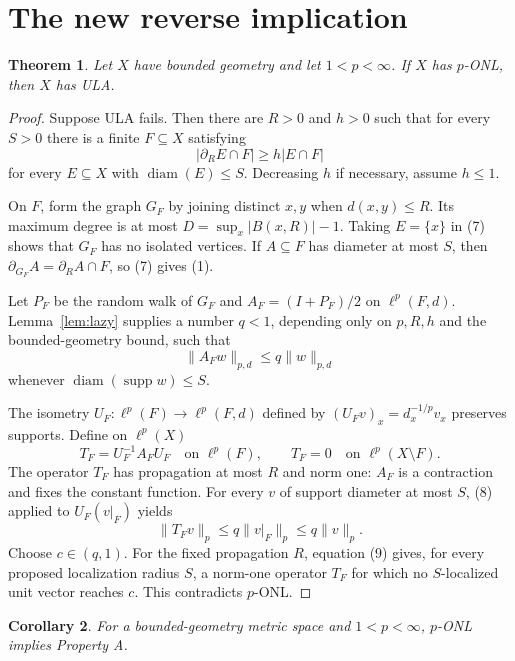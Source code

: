 \documentclass[11pt]{article}
\newtheorem{theorem}{Theorem}
\newtheorem{corollary}[theorem]{Corollary}
\newcommand{\diam}{\operatorname{diam}}
\newcommand{\supp}{\operatorname{supp}}
\begin{document}
\section{The new reverse implication}

\begin{theorem}\label{thm:onl-ula}
Let $X$ have bounded geometry and let $1<p<\infty$. If $X$ has $p$-ONL,
then $X$ has ULA.
\end{theorem}

\begin{proof}
Suppose ULA fails. Then there are $R>0$ and $h>0$ such that for every $S>0$
there is a finite $F\subseteq X$ satisfying
\[
 |\partial_R E\cap F|\ge h|E\cap F|
 \tag{7}
\]
for every $E\subseteq X$ with $\diam(E)\le S$. Decreasing $h$ if necessary,
assume $h\le1$.

On $F$, form the graph $G_F$ by joining distinct $x,y$ when $d(x,y)\le R$.
Its maximum degree is at most
$D=\sup_x|B(x,R)|-1$. Taking $E=\{x\}$ in (7) shows that $G_F$ has no
isolated vertices. If $A\subseteq F$ has diameter at most $S$, then
$\partial_{G_F}A=\partial_RA\cap F$, so (7) gives (1).

Let $P_F$ be the random walk of $G_F$ and $A_F=(I+P_F)/2$ on
$\ell^p(F,d)$. Lemma~\ref{lem:lazy} supplies a number $q<1$, depending only
on $p,R,h$ and the bounded-geometry bound, such that
\[
 \|A_Fw\|_{p,d}\le q\|w\|_{p,d}
 \tag{8}
\]
whenever $\diam(\supp w)\le S$.

The isometry $U_F:\ell^p(F)\to\ell^p(F,d)$ defined by
$(U_Fv)_x=d_x^{-1/p}v_x$ preserves supports. Define on $\ell^p(X)$
\[
 T_F=U_F^{-1}A_FU_F\quad\text{on }\ell^p(F),
 \qquad T_F=0\quad\text{on }\ell^p(X\setminus F).
\]
The operator $T_F$ has propagation at most $R$ and norm one: $A_F$ is a
contraction and fixes the constant function. For every $v$ of support diameter
at most $S$, (8) applied to $U_F(v|_F)$ yields
\[
             \|T_Fv\|_p\le q\|v|_F\|_p\le q\|v\|_p.
 \tag{9}
\]
Choose $c\in(q,1)$. For the fixed propagation $R$, equation (9) gives, for
every proposed localization radius $S$, a norm-one operator $T_F$ for which
no $S$-localized unit vector reaches $c$. This contradicts $p$-ONL.
\end{proof}

\begin{corollary}\label{cor:onl-a}
For a bounded-geometry metric space and $1<p<\infty$, $p$-ONL implies
Property A.
\end{corollary}
\end{document}
